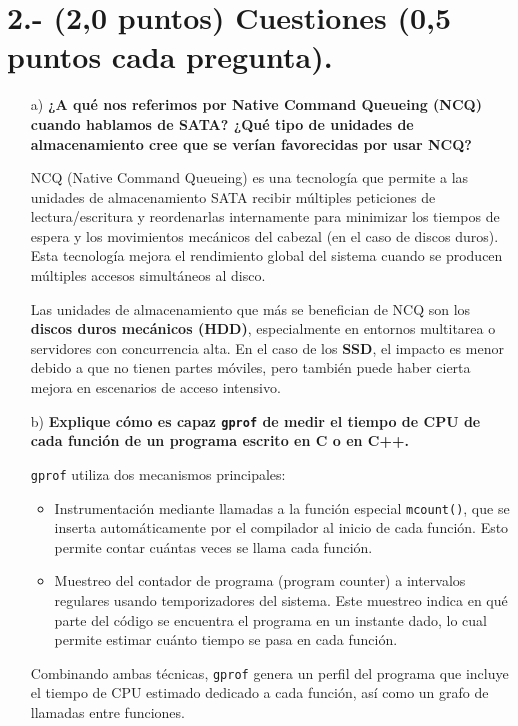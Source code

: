 \documentclass[a4paper,12pt]{article}
\begin{document}
    \section*{2.- (2,0 puntos) Cuestiones (0,5 puntos cada pregunta).}
\begin{enumerate}
    \item[a)] \textbf{¿A qué nos referimos por Native Command Queueing (NCQ) cuando hablamos de SATA? ¿Qué tipo de unidades de almacenamiento cree que se verían favorecidas por usar NCQ?}

    NCQ (Native Command Queueing) es una tecnología que permite a las unidades de almacenamiento SATA recibir múltiples peticiones de lectura/escritura y reordenarlas internamente para minimizar los tiempos de espera y los movimientos mecánicos del cabezal (en el caso de discos duros). Esta tecnología mejora el rendimiento global del sistema cuando se producen múltiples accesos simultáneos al disco. 
    
    Las unidades de almacenamiento que más se benefician de NCQ son los \textbf{discos duros mecánicos (HDD)}, especialmente en entornos multitarea o servidores con concurrencia alta. En el caso de los \textbf{SSD}, el impacto es menor debido a que no tienen partes móviles, pero también puede haber cierta mejora en escenarios de acceso intensivo.

    \item[b)] \textbf{Explique cómo es capaz \texttt{gprof} de medir el tiempo de CPU de cada función de un programa escrito en C o en C++.}

    \texttt{gprof} utiliza dos mecanismos principales:
    \begin{itemize}
        \item Instrumentación mediante llamadas a la función especial \texttt{mcount()}, que se inserta automáticamente por el compilador al inicio de cada función. Esto permite contar cuántas veces se llama cada función.
        \item Muestreo del contador de programa (program counter) a intervalos regulares usando temporizadores del sistema. Este muestreo indica en qué parte del código se encuentra el programa en un instante dado, lo cual permite estimar cuánto tiempo se pasa en cada función.
    \end{itemize}
    Combinando ambas técnicas, \texttt{gprof} genera un perfil del programa que incluye el tiempo de CPU estimado dedicado a cada función, así como un grafo de llamadas entre funciones.


\end{enumerate}
\end{document}
